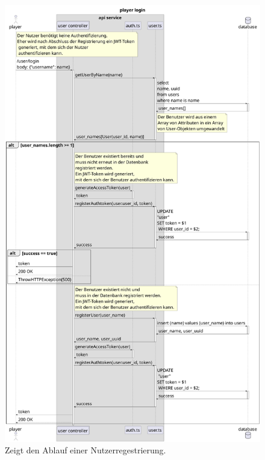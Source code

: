 \documentclass[
]{article}
\begin{document}
\begin{figure}[H]
	\centering
	\includegraphics[width=\textwidth ]{resources/login.pdf}
	\caption{Zeigt den Ablauf einer Nutzerregestrierung.}
	\label{fig:ablaufdiagramm-login}
\end{figure}
\end{document}

